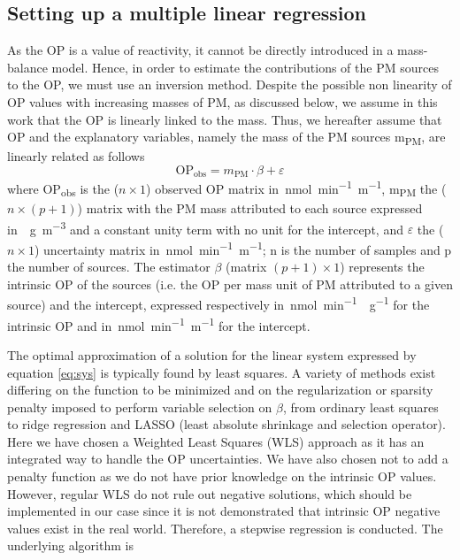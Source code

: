 \documentclass[acp, manuscript]{copernicus}
\begin{document}
\subsection{Setting up a multiple linear
regression}\label{setting-up-a-multiple-linear-regression}

As the OP is a value of reactivity, it cannot be directly introduced in
a mass-balance model. Hence, in order to estimate the contributions of
the PM sources to the OP, we must use an inversion
method. Despite the possible non linearity of OP values with increasing
masses of PM, as discussed below, we assume in this work that the OP is
linearly linked to the mass. Thus, we hereafter assume that OP and the
explanatory variables, namely the mass of the PM sources
m\textsubscript{PM}, are linearly related as follows
\begin{equation}
    \text{OP}_{\text{obs}} = m_{\text{PM}} \cdot \beta + \varepsilon
    \label{eq:sys}
\end{equation}
where OP\textsubscript{obs} is the ($n\times1$) observed OP matrix in~\unit{nmol~min^{-1}~m^{-1}}, m\textsubscript{PM} the ($n\times(p+1)$)
matrix with the PM mass attributed to each source expressed in~\unit{\mu g~m^{-3}} and a constant unity term with no unit
for the intercept, and $\varepsilon$ the ($n\times1$) uncertainty matrix
in~\unit{nmol~min^{-1}~m^{-1}}; n is the number of samples and
p the number of sources. The estimator $\beta$ (matrix $(p+1)\times1$) represents
the intrinsic OP of the sources (i.e. the OP per mass unit of PM
attributed to a given source) and the intercept, expressed respectively
in~\unit{nmol~min^{-1}~\mu g^{-1}} for the intrinsic OP and in~\unit{nmol~min^{-1}~m^{-1}} for the intercept.

The optimal approximation of a solution for the linear system expressed
by equation \ref{eq:sys} is typically found by least squares. A variety of
methods exist differing on the function to be minimized and on the
regularization or sparsity penalty imposed to perform variable selection
on $\beta$, from ordinary least squares to ridge regression and LASSO (least
absolute shrinkage and selection operator). Here we have chosen a
Weighted Least Squares (WLS) approach as it has an integrated way to
handle the OP uncertainties. We have also chosen not to add a penalty
function as we do not have prior knowledge on the intrinsic OP values.
However, regular WLS do not rule out negative solutions, which should be
implemented in our case since it is not demonstrated that intrinsic OP
negative values exist in the real world. Therefore, a stepwise
regression is conducted. The underlying algorithm is
\end{document}
